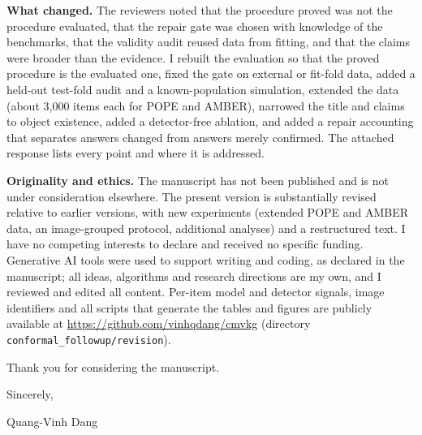 \documentclass[10.5pt,a4paper]{article}
\begin{document}
\textbf{What changed.} The reviewers noted that the procedure proved was not the procedure evaluated, that the repair gate was chosen with knowledge of the benchmarks, that the validity audit reused data from fitting, and that the claims were broader than the evidence. I rebuilt the evaluation so that the proved procedure is the evaluated one, fixed the gate on external or fit-fold data, added a held-out test-fold audit and a known-population simulation, extended the data (about 3,000 items each for POPE and AMBER), narrowed the title and claims to object existence, added a detector-free ablation, and added a repair accounting that separates answers changed from answers merely confirmed. The attached response lists every point and where it is addressed.

\textbf{Originality and ethics.} The manuscript has not been published and is not under consideration elsewhere. The present
version is substantially revised relative to earlier versions, with new experiments (extended POPE and AMBER data, an image-grouped protocol, additional analyses) and a restructured text. I have no competing interests to declare and received no specific funding. Generative AI tools were used to support writing and coding, as declared in the manuscript;
all ideas, algorithms and research directions are my own, and I reviewed and edited all content. Per-item model and detector signals, image identifiers and all scripts that generate the tables and figures are publicly available at
\url{https://github.com/vinhqdang/cmvkg} (directory \texttt{conformal\_followup/revision}).

Thank you for considering the manuscript.

Sincerely,

Quang-Vinh Dang
\end{document}
